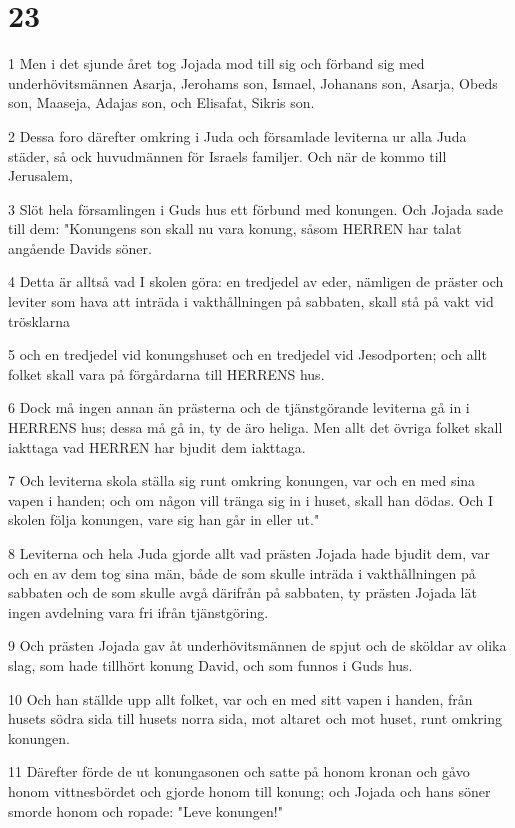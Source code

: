 \chapter{23}

\par 1 Men i det sjunde året tog Jojada mod till sig och förband sig med underhövitsmännen Asarja, Jerohams son, Ismael, Johanans son, Asarja, Obeds son, Maaseja, Adajas son, och Elisafat, Sikris son.
\par 2 Dessa foro därefter omkring i Juda och församlade leviterna ur alla Juda städer, så ock huvudmännen för Israels familjer. Och när de kommo till Jerusalem,
\par 3 Slöt hela församlingen i Guds hus ett förbund med konungen. Och Jojada sade till dem: "Konungens son skall nu vara konung, såsom HERREN har talat angående Davids söner.
\par 4 Detta är alltså vad I skolen göra: en tredjedel av eder, nämligen de präster och leviter som hava att inträda i vakthållningen på sabbaten, skall stå på vakt vid trösklarna
\par 5 och en tredjedel vid konungshuset och en tredjedel vid Jesodporten; och allt folket skall vara på förgårdarna till HERRENS hus.
\par 6 Dock må ingen annan än prästerna och de tjänstgörande leviterna gå in i HERRENS hus; dessa må gå in, ty de äro heliga. Men allt det övriga folket skall iakttaga vad HERREN har bjudit dem iakttaga.
\par 7 Och leviterna skola ställa sig runt omkring konungen, var och en med sina vapen i handen; och om någon vill tränga sig in i huset, skall han dödas. Och I skolen följa konungen, vare sig han går in eller ut."
\par 8 Leviterna och hela Juda gjorde allt vad prästen Jojada hade bjudit dem, var och en av dem tog sina män, både de som skulle inträda i vakthållningen på sabbaten och de som skulle avgå därifrån på sabbaten, ty prästen Jojada lät ingen avdelning vara fri ifrån tjänstgöring.
\par 9 Och prästen Jojada gav åt underhövitsmännen de spjut och de sköldar av olika slag, som hade tillhört konung David, och som funnos i Guds hus.
\par 10 Och han ställde upp allt folket, var och en med sitt vapen i handen, från husets södra sida till husets norra sida, mot altaret och mot huset, runt omkring konungen.
\par 11 Därefter förde de ut konungasonen och satte på honom kronan och gåvo honom vittnesbördet och gjorde honom till konung; och Jojada och hans söner smorde honom och ropade: "Leve konungen!"
